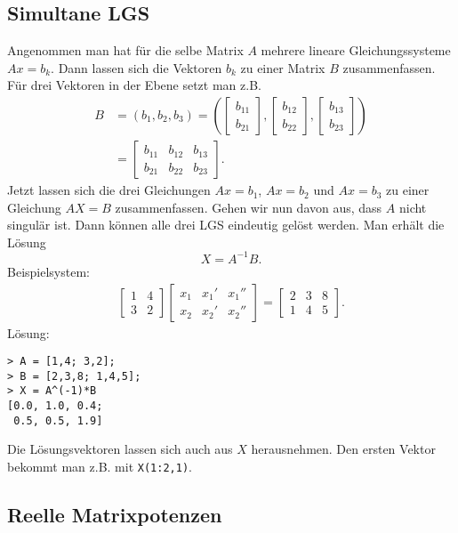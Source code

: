 \documentclass[a4paper,11pt,fleqn,twocolumn,twoside,dvipdfmx]{scrartcl}
\begin{document}
\subsection{Simultane LGS}

Angenommen man hat für die selbe Matrix $A$ mehrere lineare
Gleichungssysteme $Ax=b_k$. Dann lassen sich
die Vektoren $b_k$ zu einer Matrix $B$ zusammenfassen.
Für drei Vektoren in der Ebene setzt man z.B.
\begin{align*}
B &= (b_1,b_2,b_3)
= (\begin{bmatrix}b_{11}\\ b_{21}\end{bmatrix},
\begin{bmatrix}b_{12}\\ b_{22}\end{bmatrix},
\begin{bmatrix}b_{13}\\ b_{23}\end{bmatrix})\\
&= \begin{bmatrix}
b_{11} & b_{12} & b_{13}\\
b_{21} & b_{22} & b_{23}
\end{bmatrix}.
\end{align*}
Jetzt lassen sich die drei Gleichungen $Ax=b_1$, $Ax=b_2$ und
$Ax=b_3$ zu einer Gleichung $AX=B$ zusammenfassen.
Gehen wir nun davon aus, dass $A$ nicht singulär ist. Dann können
alle drei LGS eindeutig gelöst werden. Man erhält die Lösung
\[X = A^{-1}B.\]
Beispielsystem:
\begin{gather*}
\begin{bmatrix}
1 & 4\\
3 & 2
\end{bmatrix}
\begin{bmatrix}
x_1 & x_1' & x_1''\\
x_2 & x_2' & x_2''
\end{bmatrix}
= \begin{bmatrix}
2 & 3 & 8\\
1 & 4 & 5
\end{bmatrix}.
\end{gather*}
Lösung:
\begin{verbatim}
> A = [1,4; 3,2];
> B = [2,3,8; 1,4,5];
> X = A^(-1)*B
[0.0, 1.0, 0.4;
 0.5, 0.5, 1.9]
\end{verbatim}
Die Lösungsvektoren lassen sich auch aus $X$ herausnehmen.
Den ersten Vektor bekommt man z.B. mit \texttt{X(1:2,1)}.


\subsection{Reelle Matrixpotenzen}
\end{document}
